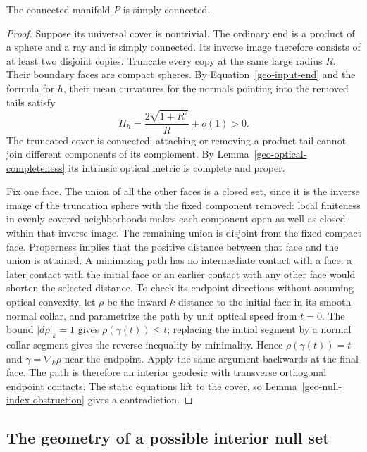 \begin{proposition}
\label{geo-simple-connectivity}
The connected manifold $P$ is simply connected.
\end{proposition}
\begin{proof}
Suppose its universal cover is nontrivial.  The ordinary end is a product of
a sphere and a ray and is simply connected.  Its inverse image therefore
consists of at least two disjoint copies.  Truncate every copy at the same
large radius $R$.  Their boundary faces are compact spheres.  By
Equation~\eqref{geo-input-end} and the formula for $h$, their mean curvatures
for the normals pointing into the removed tails satisfy
\[
 H_h=\frac{2\sqrt{1+R^2}}{R}+o(1)>0.
\]
The truncated cover is connected: attaching or removing a product tail
cannot join different components of its complement.  By
Lemma~\ref{geo-optical-completeness} its intrinsic optical metric is complete
and proper.

Fix one face.  The union of all the other faces is a closed set, since it
is the inverse image of the truncation sphere with the fixed component
removed: local finiteness in evenly covered neighborhoods makes each
component open as well as closed within that inverse image.  The remaining
union is disjoint from the fixed compact face.  Properness implies that the positive
distance between that face and the union is attained.  A minimizing path
has no intermediate contact with a face: a later contact with the initial
face or an earlier contact with any other face would shorten the selected
distance. To check its endpoint directions without assuming optical
convexity, let \(\rho\) be the inward \(k\)-distance to the initial
face in its smooth normal collar, and parametrize the path by unit
optical speed from \(t=0\). The bound \(|d\rho|_k=1\) gives
\(\rho(\gamma(t))\le t\); replacing the initial segment by a normal
collar segment gives the reverse inequality by minimality. Hence
\(\rho(\gamma(t))=t\) and \(\dot\gamma=\nabla_k\rho\) near the
endpoint. Apply the same argument backwards at the final face.
The path is therefore an interior geodesic with transverse orthogonal
endpoint contacts. The static equations lift to the cover, so
Lemma~\ref{geo-null-index-obstruction} gives a contradiction.
\end{proof}

\subsection{The geometry of a possible interior null set}


